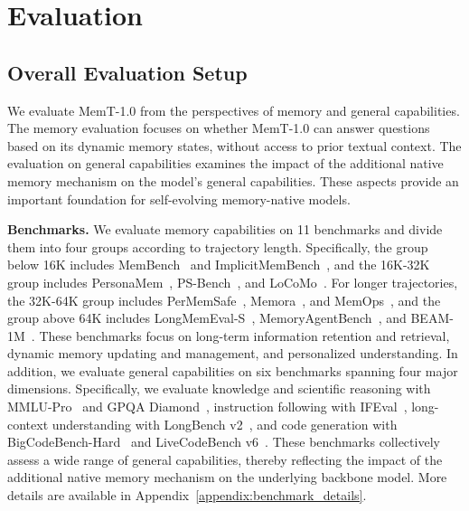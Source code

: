 \section{Evaluation}
\label{sec:evaluation}

\subsection{Overall Evaluation Setup}
We evaluate MemT-1.0 from the perspectives of memory and general capabilities.
The memory evaluation focuses on whether MemT-1.0 can answer questions based on its dynamic memory states, without access to prior textual context.
The evaluation on general capabilities examines the impact of the additional native memory mechanism on the model’s general capabilities.
These aspects provide an important foundation for self-evolving memory-native models.

\textbf{Benchmarks.}
We evaluate memory capabilities on 11 benchmarks and divide them into four groups according to trajectory length.
Specifically, the group below 16K includes MemBench~\cite{tan2025membench} and ImplicitMemBench~\cite{qin2026implicitmembench}, and the 16K-32K group includes PersonaMem~\cite{jiang2025know}, PS-Bench~\cite{guo2026personalization}, and LoCoMo~\cite{maharana2024evaluating}.
For longer trajectories, the 32K-64K group includes PerMemSafe~\cite{an2026permemsafe}, Memora~\cite{uddin2026recall}, and MemOps~\cite{hao2026memops}, and the group above 64K includes LongMemEval-S~\cite{wu2024longmemeval}, MemoryAgentBench~\cite{hu2026evaluating}, and BEAM-1M~\cite{tavakoli2025beyond}.
These benchmarks focus on long-term information retention and retrieval, dynamic memory updating and management, and personalized understanding.
In addition, we evaluate general capabilities on six benchmarks spanning four major dimensions.
Specifically, we evaluate knowledge and scientific reasoning with MMLU-Pro~\cite{wang2024mmlu} and GPQA Diamond~\cite{rein2023gpqa}, instruction following with IFEval~\cite{zhou2023instruction},
long-context understanding with LongBench v2~\cite{bai2025longbench}, and code generation with BigCodeBench-Hard~\cite{zhuo2025bigcodebench} and LiveCodeBench v6~\cite{jain2025livecodebench}.
These benchmarks collectively assess a wide range of general capabilities, thereby reflecting the impact of the additional native memory mechanism on the underlying backbone model.
More details are available in Appendix~\ref{appendix:benchmark_details}.

